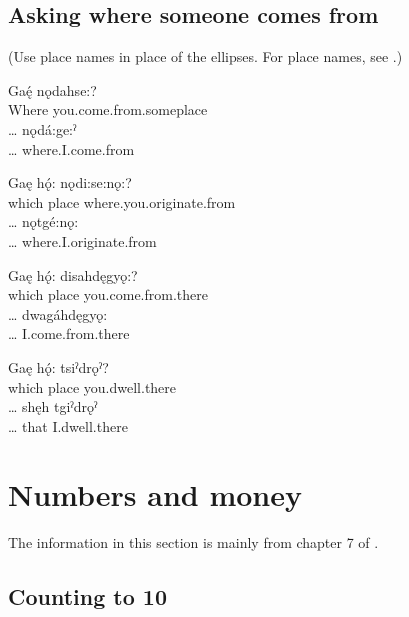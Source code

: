 \subsection{Asking where someone comes from}
(Use place names in place of the ellipses. For place names, see .)

\ea 
\ea 
\gll Gaę́ nǫdahse:?\\
Where you.come.from.someplace\\
\glt {}
\ex 
\gll … nǫdá:ge:ˀ\\
… where.I.come.from\\
\glt {}
\z 
\z

\ea 
\ea 
\gll Gaę hǫ́: nǫdi:se:nǫ:?\\
which place where.you.originate.from\\
\glt {}
\ex 
\gll … nǫtgé:nǫ:\\
… where.I.originate.from\\
\glt {}
\z 
\z 

\ea
\ea 
\gll Gaę hǫ́: disahdęgyǫ:?\\
which place you.come.from.there\\
\glt {}
\ex 
\gll … dwagáhdęgyǫ:\\
… I.come.from.there\\
\glt {}
\z
\z 

\ea 
\ea 
\gll Gaę hǫ́: tsiˀdrǫˀ?\\
which place you.dwell.there\\
\glt {}
\ex 
\gll … shęh tgiˀdrǫˀ\\
… that I.dwell.there\\
\glt {}
\z 
\z 


\section{Numbers and money} \label{numbers and money}
The information in this section is mainly from chapter 7 of \citet[73--80]{mithun_watewayestanih_1984}.
\subsection{Counting to 10} \label{counting to 10}
\begin{multicols}{2}
 
 
 
 
 
 
 
 
 
 
\end{multicols}

